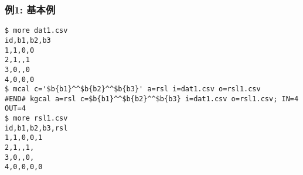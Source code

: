 \subsubsection*{例1: 基本例}



\begin{Verbatim}[baselinestretch=0.7,frame=single]
$ more dat1.csv
id,b1,b2,b3
1,1,0,0
2,1,,1
3,0,,0
4,0,0,0
$ mcal c='$b{b1}^^$b{b2}^^$b{b3}' a=rsl i=dat1.csv o=rsl1.csv
#END# kgcal a=rsl c=$b{b1}^^$b{b2}^^$b{b3} i=dat1.csv o=rsl1.csv; IN=4 OUT=4
$ more rsl1.csv
id,b1,b2,b3,rsl
1,1,0,0,1
2,1,,1,
3,0,,0,
4,0,0,0,0
\end{Verbatim}
